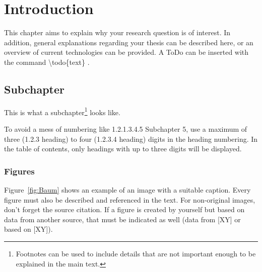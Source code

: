 %
%

\section{Introduction}
\label{sec:introduction}

This chapter aims to explain why your research question is of interest. In addition, general explanations regarding your thesis can be described here, or an overview of current technologies can be provided. A ToDo can be inserted with the command \textbackslash todo\{text\} .


\subsection{Subchapter}
\label{sec:subchapter}

This is what a subchapter\footnote{Footnotes can be used to include details that are not important enough to be explained in the main text.} looks like.

To avoid a mess of numbering like {\glqq}1.2.1.3.4.5 Subchapter 5{\grqq}, use a maximum of three (1.2.3 heading) to four (1.2.3.4 heading) digits in the heading numbering. In the table of contents, only headings with up to three digits will be displayed.


\subsubsection{Figures}
\label{sec:figures}

Figure~\ref{fig:Baum} shows an example of an image with a suitable caption. Every figure must also be described and referenced in the text. For non-original images, don’t forget the source citation. If a figure is created by yourself but based on data from another source, that must be indicated as well (data from [XY] or based on [XY]).


